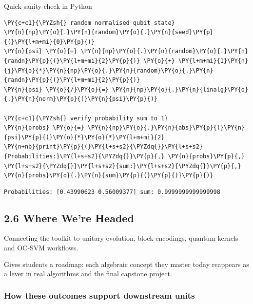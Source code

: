     Quick sanity check in Python

    \begin{tcolorbox}[breakable, size=fbox, boxrule=1pt, pad at break*=1mm,colback=cellbackground, colframe=cellborder]
\begin{Verbatim}[commandchars=\\\{\}]
\PY{c+c1}{\PYZsh{} random normalised qubit state}
\PY{n}{np}\PY{o}{.}\PY{n}{random}\PY{o}{.}\PY{n}{seed}\PY{p}{(}\PY{l+m+mi}{0}\PY{p}{)}
\PY{n}{psi} \PY{o}{=} \PY{n}{np}\PY{o}{.}\PY{n}{random}\PY{o}{.}\PY{n}{randn}\PY{p}{(}\PY{l+m+mi}{2}\PY{p}{)} \PY{o}{+} \PY{l+m+mi}{1}\PY{n}{j}\PY{o}{*}\PY{n}{np}\PY{o}{.}\PY{n}{random}\PY{o}{.}\PY{n}{randn}\PY{p}{(}\PY{l+m+mi}{2}\PY{p}{)}
\PY{n}{psi} \PY{o}{/}\PY{o}{=} \PY{n}{np}\PY{o}{.}\PY{n}{linalg}\PY{o}{.}\PY{n}{norm}\PY{p}{(}\PY{n}{psi}\PY{p}{)}

\PY{c+c1}{\PYZsh{} verify probability sum to 1}
\PY{n}{probs} \PY{o}{=} \PY{n}{np}\PY{o}{.}\PY{n}{abs}\PY{p}{(}\PY{n}{psi}\PY{p}{)}\PY{o}{*}\PY{o}{*}\PY{l+m+mi}{2}
\PY{n+nb}{print}\PY{p}{(}\PY{l+s+s2}{\PYZdq{}}\PY{l+s+s2}{Probabilities:}\PY{l+s+s2}{\PYZdq{}}\PY{p}{,} \PY{n}{probs}\PY{p}{,} \PY{l+s+s2}{\PYZdq{}}\PY{l+s+s2}{sum:}\PY{l+s+s2}{\PYZdq{}}\PY{p}{,} \PY{n}{probs}\PY{o}{.}\PY{n}{sum}\PY{p}{(}\PY{p}{)}\PY{p}{)}
\end{Verbatim}
\end{tcolorbox}

    \begin{Verbatim}[commandchars=\\\{\}]
Probabilities: [0.43990623 0.56009377] sum: 0.9999999999999998
    \end{Verbatim}

    \hypertarget{where-were-headed}{%
\subsection*{2.6 Where We're Headed}\label{where-were-headed}}

Connecting the toolkit to unitary evolution, block‑encodings, quantum
kernels and OC‑SVM workflows.

Gives students a roadmap: each algebraic concept they master today
reappears as a lever in real algorithms and the final capstone project.

\hypertarget{how-these-outcomes-support-downstream-units}{%
\subsubsection*{How these outcomes support downstream
units}\label{how-these-outcomes-support-downstream-units}}

